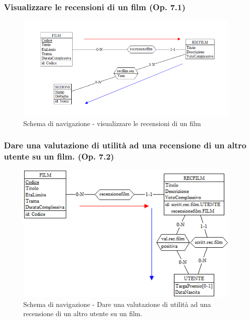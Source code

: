 \documentclass[a4paper,12pt]{report}
\begin{document}
	\subsubsection{Visualizzare le recensioni di un film (Op. 7.1)}
	\begin{figure}[H]
		\centering
		\includegraphics[width=450pt]{ER/navigazione/visualrecensionifilm.png}
		\caption{Schema di navigazione - visualizzare le recensioni di un film}
	\end{figure}

	\subsubsection{Dare una valutazione di utilità ad una recensione di un altro utente su un film. (Op. 7.2)}
	\begin{figure}[H]
		\centering
		\includegraphics[width=450pt]{ER/navigazione/valutazionerecfilm.png}
		\caption{Schema di navigazione - Dare una valutazione di utilità ad una recensione di un altro utente su un film.}
	\end{figure}
	
\end{document}
